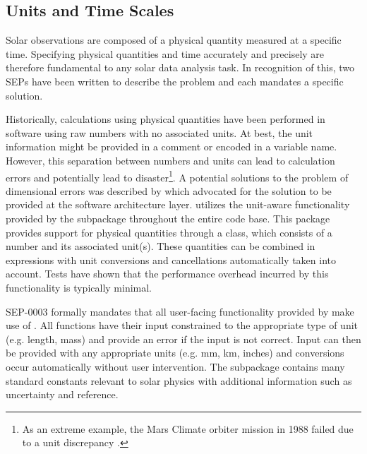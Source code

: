 \subsection{Units and Time Scales}
\label{sec:units}

Solar observations are composed of a physical quantity measured at a specific time.
Specifying physical quantities and time accurately and precisely are therefore fundamental to any solar data analysis task.
In recognition of this, two SEPs have been written to describe the problem and each mandates a specific solution.

Historically, calculations using physical quantities have been performed in software using raw numbers with no associated units.
At best, the unit information might be provided in a comment or encoded in a variable name.
However, this separation between numbers and units can lead to calculation errors and potentially lead to disaster\footnote{As an extreme example, the Mars Climate orbiter mission in 1988 failed due to a unit discrepancy \citep{mco_mishap_report}.}.
A potential solutions to the problem of dimensional errors was described by \citet{Damevski2009} which advocated for the solution to be provided at the software architecture layer.
\sunpypkg utilizes the unit-aware functionality provided by the  subpackage throughout the entire code base.
This package provides support for physical quantities through a  class, which consists of a number and its associated unit(s).
These quantities can be combined in expressions with unit conversions and cancellations automatically taken into account.
Tests have shown that the performance overhead incurred by this functionality is typically minimal.

SEP-0003 \citep{sep-0003} formally mandates that all user-facing functionality provided by \sunpypkg make use of .
All functions have their input constrained to the appropriate type of unit (e.g. length, mass) and provide an error if the input is not correct.
Input can then be provided with any appropriate units (e.g. mm, km, inches) and conversions occur automatically without user intervention.
The  subpackage contains many standard constants relevant to solar physics with additional information such as uncertainty and reference.

